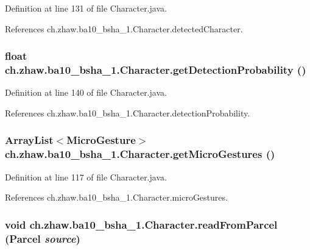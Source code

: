 Definition at line 131 of file Character.java.

References ch.zhaw.ba10\_\-bsha\_\-1.Character.detectedCharacter.\hypertarget{classch_1_1zhaw_1_1ba10__bsha__1_1_1Character_afaae3f56a30c91e7bac95a24501bae6c}{
\subsubsection[{getDetectionProbability}]{\setlength{\rightskip}{0pt plus 5cm}float ch.zhaw.ba10\_\-bsha\_\-1.Character.getDetectionProbability ()}}
\label{classch_1_1zhaw_1_1ba10__bsha__1_1_1Character_afaae3f56a30c91e7bac95a24501bae6c}


Definition at line 140 of file Character.java.

References ch.zhaw.ba10\_\-bsha\_\-1.Character.detectionProbability.\hypertarget{classch_1_1zhaw_1_1ba10__bsha__1_1_1Character_a5db74fce6f0c14edd6eb3e4a693ad689}{
\subsubsection[{getMicroGestures}]{\setlength{\rightskip}{0pt plus 5cm}ArrayList$<${\bf MicroGesture}$>$ ch.zhaw.ba10\_\-bsha\_\-1.Character.getMicroGestures ()}}
\label{classch_1_1zhaw_1_1ba10__bsha__1_1_1Character_a5db74fce6f0c14edd6eb3e4a693ad689}


Definition at line 117 of file Character.java.

References ch.zhaw.ba10\_\-bsha\_\-1.Character.microGestures.\hypertarget{classch_1_1zhaw_1_1ba10__bsha__1_1_1Character_ad3676c8beb543679a81599fa69bb447d}{
\subsubsection[{readFromParcel}]{\setlength{\rightskip}{0pt plus 5cm}void ch.zhaw.ba10\_\-bsha\_\-1.Character.readFromParcel (Parcel {\em source})}}
\label{classch_1_1zhaw_1_1ba10__bsha__1_1_1Character_ad3676c8beb543679a81599fa69bb447d}


